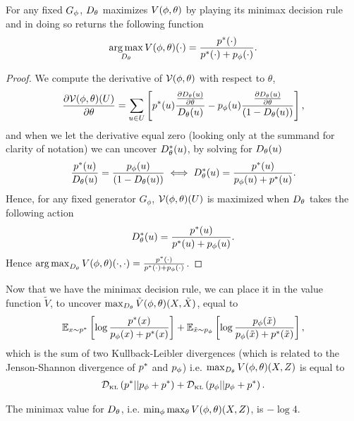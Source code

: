 \begin{theorem}%
 \label{theorem:minimax}
 For any fixed $G_\phi$, $D_\theta$ maximizes $V(\phi, \theta)$ by playing its minimax
 decision rule and in doing so returns the following function
  \begin{align}
    \operatorname*{arg\,max}_{D_\theta}V(\phi, \theta)(\cdot) = {p^*(\cdot) \over p^*(\cdot) + p_{\phi}(\cdot)}.
  \end{align}
\end{theorem}

\begin{proof}
  We compute the derivative of $\mathcal{V}(\phi, \theta)$ with respect to $\theta$,
  \begin{align}
    \label{eq:derivatives}
    {\partial  \mathcal{V}(\phi, \theta) (U) \over \partial \theta} = \sum_{u \in U}\left[ p^*(u) { {\partial D_\theta(u) \over \partial \theta} \over D_\theta(u)} -
    p_{\phi}(u) {{\partial D_\theta(u) \over \partial \theta} \over (1 - D_\theta(u))}\right],
  \end{align}
  and when we let the derivative equal zero (looking only at the summand for
  clarity of notation) we can uncover $D_\theta^*(u)$, by solving for $D_\theta(u)$
  \begin{align}
    \label{eq:20}
    {p^*(u)\over D_\theta(u)} = {p_{\phi}(u) \over (1 - D_\theta(u))} \iff D_\theta^*(u) = {p^*(u) \over p_{\phi}(u) + p^*(u)}.
  \end{align}
  Hence, for any fixed generator $G_\phi$, $\mathcal{V}(\phi, \theta)(U)$ is maximized when $D_\theta$ takes
  the following action
  \begin{align}
    \label{eq:13}
    D_\theta^*(u) = {p^*(u) \over p^*(u) + p_{\phi}(u)}.
  \end{align}
  Hence $\operatorname*{arg\,max}_{D_\theta}V(\phi, \theta)(\cdot, \cdot) = {p^*(\cdot) \over p^*(\cdot) + p_{\phi}(\cdot)}$.
\end{proof}

Now that we have the minimax decision rule, we can place it in the
value function $\tilde{V}$, to uncover
$\max_{D_\theta}\tilde{V}(\phi, \theta)(X, \tilde{X})$, equal to
\begin{align}
  \label{eq:sum-of-two-kl-divergences}
   \mathbb{E}_{x \sim p^*}\left[\log{{p^*(x)\over p_{\phi}(x)+ p^*(x)}}\right] + \mathbb{E}_{\tilde{x} \sim p_{\phi}}\left[\log{p_{\phi}(\tilde{x})\over p_{\phi}(\tilde{x})+ p^*(\tilde{x})} \right],
\end{align}
which is the sum of two Kullback-Leibler divergences (which is related
to the Jenson-Shannon divergence of $p^*$ and $p_{\phi}$)
i.e. $\max_{D_\theta}V(\phi, \theta)(X, Z)$ is equal to
\begin{align}
  \label{eq:16}
  \mathcal{D}_{\text{\tiny KL}}\left( p^* \middle| \middle| p_{\phi} + p^* \right) + \mathcal{D}_{\text{\tiny KL}}\left( p_{\phi} \middle| \middle| p_{\phi} + p^* \right).
\end{align}
\begin{lemma}
  The minimax value for $D_\theta$, i.e. $\min_{\phi}\max_{\theta}V(\phi, \theta)(X, Z)$, is $ - \log{4}$.
\end{lemma}

